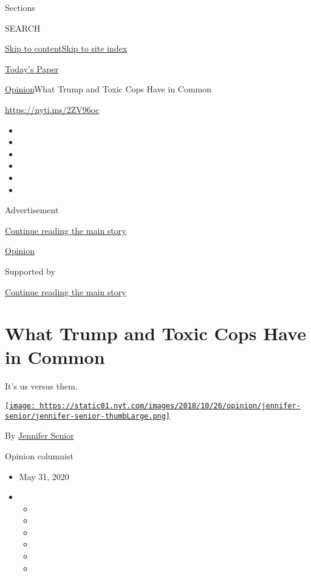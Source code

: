 Sections

SEARCH

\protect\hyperlink{site-content}{Skip to
content}\protect\hyperlink{site-index}{Skip to site index}

\href{https://myaccount.nytimes.com/auth/login?response_type=cookie\&client_id=vi}{}

\href{https://www.nytimes.com/section/todayspaper}{Today's Paper}

\href{/section/opinion}{Opinion}\textbar{}What Trump and Toxic Cops Have
in Common

\href{https://nyti.ms/2ZV96oc}{https://nyti.ms/2ZV96oc}

\begin{itemize}
\item
\item
\item
\item
\item
\item
\end{itemize}

Advertisement

\protect\hyperlink{after-top}{Continue reading the main story}

\href{/section/opinion}{Opinion}

Supported by

\protect\hyperlink{after-sponsor}{Continue reading the main story}

\hypertarget{what-trump-and-toxic-cops-have-in-common}{%
\section{What Trump and Toxic Cops Have in
Common}\label{what-trump-and-toxic-cops-have-in-common}}

It's us versus them.

\href{https://www.nytimes.com/by/jennifer-senior}{\texttt{[image: https://static01.nyt.com/images/2018/10/26/opinion/jennifer-senior/jennifer-senior-thumbLarge.png]}}

By \href{https://www.nytimes.com/by/jennifer-senior}{Jennifer Senior}

Opinion columnist

\begin{itemize}
\item
  May 31, 2020
\item
  \begin{itemize}
  \item
  \item
  \item
  \item
  \item
  \item
  \end{itemize}
\end{itemize}

